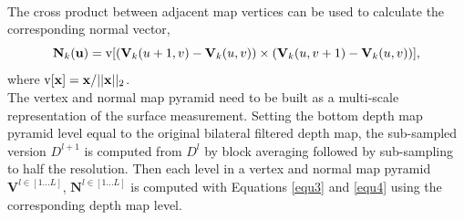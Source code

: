 \documentclass[a4paper,12pt]{article}
\begin{document}
\\The cross product between adjacent map vertices can be used to calculate the corresponding normal vector,
\begin{equation}
	\mathbf{N}_k(\mathbf{u}) = {\rm v}[(\mathbf{V}_k(u+1,v)-\mathbf{V}_k(u,v))\times(\mathbf{V}_k(u,v+1)-\mathbf{V}_k(u,v))],
	\label{equ4}
\end{equation}
where ${\rm v}[\mathbf{x}] = \mathbf{x}/||\mathbf{x}||_2$.
\\The vertex and normal map pyramid need to be built as a multi-scale representation of the surface measurement. 
Setting the bottom depth map pyramid level equal to the original bilateral filtered depth map, the sub-sampled version $D^{l+1}$ is computed from $D^l$ by block averaging followed by sub-sampling to half the resolution. 
Then each level in a vertex and normal map pyramid $\mathbf{V}^{l\in[1...L]}$, $\mathbf{N}^{l\in[1...L]}$ is computed with Equations \ref{equ3} and \ref{equ4} using the corresponding depth map level.
\end{document}

